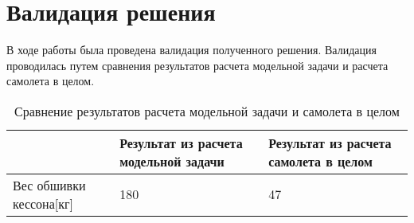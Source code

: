 \chapter{Валидация решения}


В ходе работы была проведена валидация полученного решения. Валидация проводилась путем сравнения результатов расчета модельной задачи и расчета самолета в целом. 

\begin{table}[ht]
\caption{Сравнение результатов расчета модельной задачи и самолета в целом}
\label{tab:ComparingResults}
\begin{tabu}to \linewidth{|X|X[m c]|X[m c]|}
\hline
& Результат из расчета модельной задачи & Результат из расчета самолета в целом\\ \hline
Вес обшивки кессона[кг] & 180 & 47 \\ \hline


\end{tabu}
\end{table}

